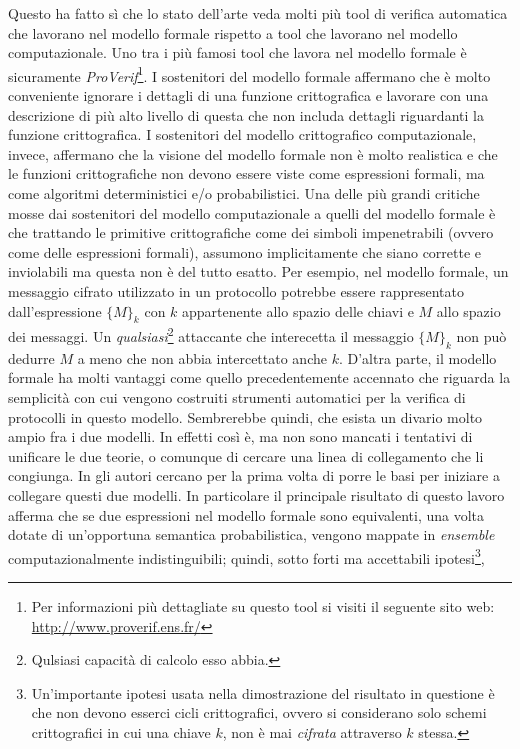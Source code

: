 \documentclass[a4paper,openright,twoside,12pt]{report}
\begin{document}
Questo ha fatto s\`i che lo stato dell'arte veda molti pi\`u tool di
verifica automatica che lavorano nel modello formale rispetto a tool che lavorano nel modello computazionale. 
Uno tra i pi\`u famosi tool che lavora nel modello formale \`e sicuramente \emph{ProVerif}\footnote{Per informazioni pi\`u dettagliate su questo tool si visiti il seguente sito web: 
\url{http://www.proverif.ens.fr/}}.
I sostenitori del modello formale affermano che \`e molto conveniente ignorare i dettagli di una funzione crittografica 
e lavorare con una descrizione 
di pi\`u alto livello di questa che non includa dettagli riguardanti la funzione crittografica. 
I sostenitori del modello crittografico computazionale, invece, affermano che la visione
del modello formale non \`e molto realistica e che le funzioni crittografiche non devono essere viste come espressioni 
formali, ma come algoritmi deterministici e/o probabilistici. Una delle pi\`u grandi critiche mosse dai sostenitori del modello
computazionale a quelli del modello formale \`e che trattando le primitive crittografiche come dei simboli impenetrabili (ovvero come delle espressioni formali), 
assumono implicitamente che siano corrette e inviolabili ma questa non \`e
del tutto esatto. Per esempio, nel modello formale, un messaggio cifrato utilizzato in un protocollo  
potrebbe essere rappresentato dall'espressione $\{M\}_k$ con $k$ appartenente allo spazio delle chiavi
e $M$ allo spazio dei messaggi. Un \emph{qualsiasi}\footnote{Qulsiasi capacit\`a di calcolo esso abbia.} 
attaccante che interecetta il messaggio $\{M\}_k$ non pu\`o dedurre $M$ a meno
che non abbia intercettato anche $k$.
D'altra parte, il modello formale ha molti vantaggi come quello precedentemente accennato che riguarda la semplicit\`a 
con cui vengono costruiti strumenti automatici per la verifica di protocolli in questo modello.
Sembrerebbe quindi, che esista un divario molto ampio fra i due modelli. In effetti cos\`i \`e, ma non sono mancati i tentativi di unificare le due teorie, o comunque di cercare una linea
di collegamento che li congiunga.
In \cite{DBLP:journals/joc/AbadiR07} gli autori cercano per la prima volta di porre le basi per iniziare a collegare questi due modelli.
In particolare il principale risultato di questo lavoro afferma che se due espressioni nel modello formale sono equivalenti, una volta dotate di un'opportuna semantica probabilistica,
vengono mappate in \emph{ensemble} computazionalmente indistinguibili; quindi, sotto forti ma accettabili ipotesi\footnote{Un'importante ipotesi usata nella dimostrazione del risultato in questione
\`e che non devono esserci cicli crittografici, ovvero si considerano solo schemi crittografici in cui una chiave $k$, non \`e mai \emph{cifrata} attraverso $k$ stessa.}, 
\end{document}
